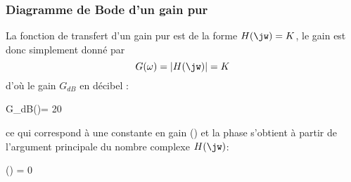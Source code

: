 \newpage

\subsubsection{Diagramme de Bode d'un gain pur}

La fonction de transfert d'un gain pur est de la forme $H(\jw)=K$,
le gain est donc simplement donné par 
$$
G(\omega)=|H(\jw)|=K
$$ 
d'où le gain $G_{dB}$ en décibel :
\begin{bequation}
G_{dB}(\omega)= 20
\end{bequation} ce qui correspond à une constante en gain () 
et la phase s'obtient à partir de l'argument principale du nombre complexe $H(\jw)$:
\begin{bequation}
\phi(\omega) = 0
\end{bequation}

